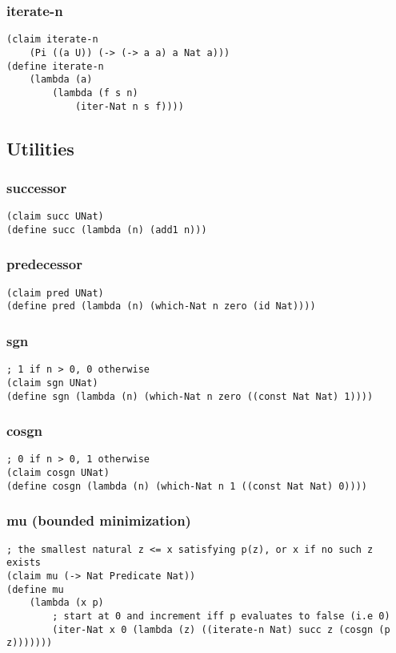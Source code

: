 \subsubsection{iterate-n} \label{code:iterate-n}
\begin{verbatim}
(claim iterate-n
    (Pi ((a U)) (-> (-> a a) a Nat a)))
(define iterate-n
    (lambda (a)
        (lambda (f s n)
            (iter-Nat n s f))))
\end{verbatim}


\subsection{Utilities}

\subsubsection{successor} \label{code:successor}
\begin{verbatim}
(claim succ UNat)
(define succ (lambda (n) (add1 n)))
\end{verbatim}

\subsubsection{predecessor} \label{code:predecessor}
\begin{verbatim}
(claim pred UNat)
(define pred (lambda (n) (which-Nat n zero (id Nat))))
\end{verbatim}

\subsubsection{sgn} \label{code:sgn}
\begin{verbatim}
; 1 if n > 0, 0 otherwise
(claim sgn UNat)
(define sgn (lambda (n) (which-Nat n zero ((const Nat Nat) 1))))
\end{verbatim}

\subsubsection{cosgn} \label{code:cosgn}
\begin{verbatim}
; 0 if n > 0, 1 otherwise
(claim cosgn UNat)
(define cosgn (lambda (n) (which-Nat n 1 ((const Nat Nat) 0))))
\end{verbatim}

\subsubsection{mu (bounded minimization)} \label{code:mu}
\begin{verbatim}
; the smallest natural z <= x satisfying p(z), or x if no such z exists
(claim mu (-> Nat Predicate Nat))
(define mu
    (lambda (x p)
        ; start at 0 and increment iff p evaluates to false (i.e 0)
        (iter-Nat x 0 (lambda (z) ((iterate-n Nat) succ z (cosgn (p z)))))))
\end{verbatim}


